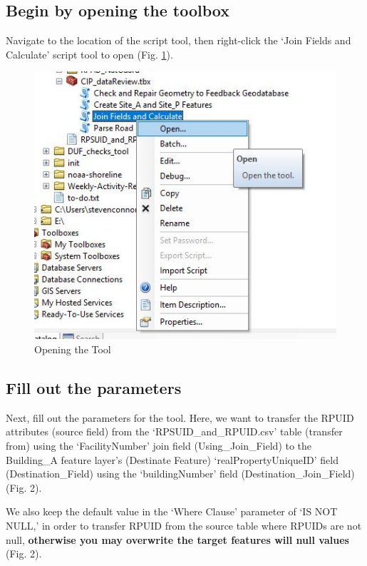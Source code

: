 \documentclass[openany]{book}
\theoremstyle{definition}
\theoremstyle{definition}
\theoremstyle{definition}
\theoremstyle{remark}
\begin{document}
\subsection{Begin by opening the
toolbox}\label{begin-by-opening-the-toolbox}

Navigate to the location of the script tool, then right-click the `Join
Fields and Calculate' script tool to open (Fig. \ref{fig:jcopen}).

\begin{figure}[H]

{\centering \includegraphics{figures/joinCalcopentool} 

}

\caption{Opening the Tool}\label{fig:jcopen}
\end{figure}

\subsection{Fill out the parameters}\label{fill-out-the-parameters}

Next, fill out the parameters for the tool. Here, we want to transfer
the RPUID attributes (source field) from the `RPSUID\_and\_RPUID.csv'
table (transfer from) using the `FacilityNumber' join field
(Using\_Join\_Field) to the Building\_A feature layer's (Destinate
Feature) `realPropertyUniqueID' field (Destination\_Field) using the
`buildingNumber' field (Destination\_Join\_Field) (Fig. 2).

We also keep the default value in the `Where Clause' parameter of `IS
NOT NULL,' in order to transfer RPUID from the source table where RPUIDs
are not null, \textbf{otherwise you may overwrite the target features
will null values} (Fig. 2).
\end{document}
